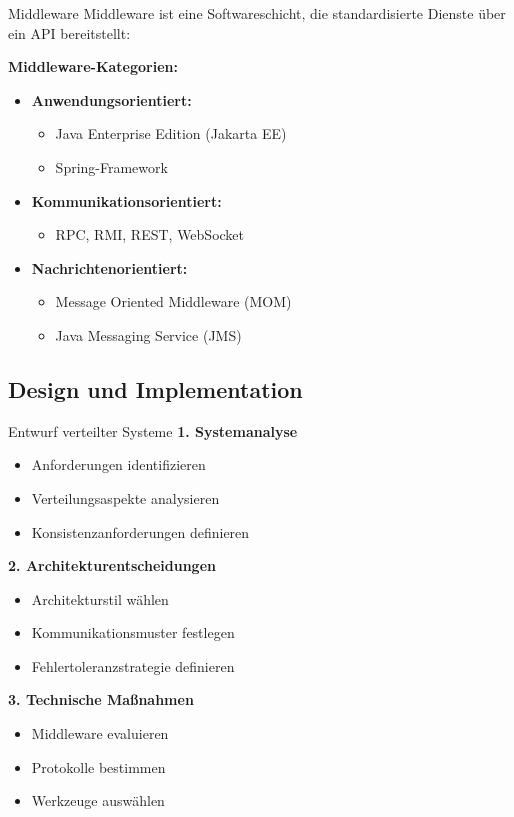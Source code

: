 \begin{definition}{Middleware}
Middleware ist eine Softwareschicht, die standardisierte Dienste über ein API bereitstellt:

\textbf{Middleware-Kategorien:}
\begin{itemize}
    \item \textbf{Anwendungsorientiert:}
    \begin{itemize}
        \item Java Enterprise Edition (Jakarta EE)
        \item Spring-Framework
    \end{itemize}
    \item \textbf{Kommunikationsorientiert:}
    \begin{itemize}
        \item RPC, RMI, REST, WebSocket
    \end{itemize}
    \item \textbf{Nachrichtenorientiert:}
    \begin{itemize}
        \item Message Oriented Middleware (MOM)
        \item Java Messaging Service (JMS)
    \end{itemize}
\end{itemize}
\end{definition}

\subsection{Design und Implementation}

\begin{KR}{Entwurf verteilter Systeme}
\textbf{1. Systemanalyse}
\begin{itemize}
    \item Anforderungen identifizieren
    \item Verteilungsaspekte analysieren
    \item Konsistenzanforderungen definieren
\end{itemize}

\textbf{2. Architekturentscheidungen}
\begin{itemize}
    \item Architekturstil wählen
    \item Kommunikationsmuster festlegen
    \item Fehlertoleranzstrategie definieren
\end{itemize}

\textbf{3. Technische Maßnahmen}
\begin{itemize}
    \item Middleware evaluieren
    \item Protokolle bestimmen
    \item Werkzeuge auswählen
\end{itemize}
\end{KR}

